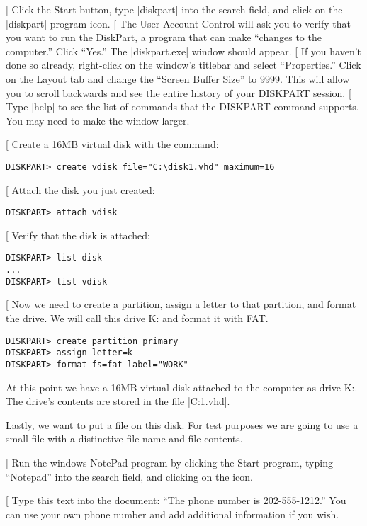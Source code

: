\documentclass[11pt,letter]{book}
\makeatletter
\def\step{%
   \@ifnextchar[ \@step{\@noitemargtrue\@step[\@itemlabel]}}
\def\@step[#1]{\item[#1]\mbox{}\hspace*{\dimexpr-\labelwidth-\labelsep}}
\makeatother
\begin{document}
\begin{steps}
\step Click the Start button, type |diskpart| into the search field,
and click on the |diskpart| program icon.
\step The User Account Control will ask you to verify that you want to
run the DiskPart, a program that can make ``changes to the computer.''
Click ``Yes.''  The |diskpart.exe| window should appear.
\step If you haven't done so already, right-click on the window's
titlebar and select ``Properties.'' Click on the Layout tab and change
the ``Screen Buffer Size'' to 9999. This will allow you to scroll
backwards and see the entire history of your DISKPART session.
\step Type |help| to see the list of commands that the DISKPART
command supports. You may need to make the window larger.

\step Create a 16MB virtual disk with the command:

\begin{Verbatim}
DISKPART> create vdisk file="C:\disk1.vhd" maximum=16
\end{Verbatim}

\step Attach the disk you just created:
\begin{Verbatim}
DISKPART> attach vdisk
\end{Verbatim}

\step Verify that the disk is attached:
\begin{Verbatim}
DISKPART> list disk
...
DISKPART> list vdisk
\end{Verbatim}

\step Now we need to create a partition, assign a letter to that
partition, and format the drive. We will call this drive K: and format
it with FAT. 
\begin{Verbatim}
DISKPART> create partition primary
DISKPART> assign letter=k
DISKPART> format fs=fat label="WORK"
\end{Verbatim}

At this point we have a 16MB virtual disk attached to the computer as
drive K:. The drive's contents are stored in the file |C:\disk1.vhd|.

Lastly, we want to put a file on this disk. For test purposes we are
going to use a small file with a distinctive file name and file
contents.

\step Run the windows NotePad program by clicking the Start program,
typing ``Notepad'' into the search field, and clicking on the icon.

\step Type this text into the document:  ``The phone number is
202-555-1212.'' You can use your own phone number and add additional
information if you wish.


\end{steps}
\end{document}
